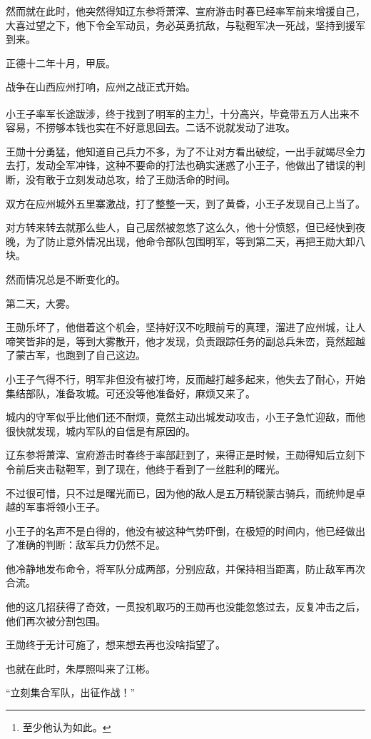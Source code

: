 \begin{multicols}{\theparacolNo}
然而就在此时，他突然得知辽东参将萧滓、宣府游击时春已经率军前来增援自己，大喜过望之下，他下令全军动员，务必英勇抗敌，与鞑靼军决一死战，坚持到援军到来。

正德十二年十月，甲辰。

战争在山西应州打响，应州之战正式开始。

小王子率军长途跋涉，终于找到了明军的主力\footnote{至少他认为如此。}，十分高兴，毕竟带五万人出来不容易，不捞够本钱也实在不好意思回去。二话不说就发动了进攻。

王勋十分勇猛，他知道自己兵力不多，为了不让对方看出破绽，一出手就竭尽全力去打，发动全军冲锋，这种不要命的打法也确实迷惑了小王子，他做出了错误的判断，没有敢于立刻发动总攻，给了王勋活命的时间。

双方在应州城外五里寨激战，打了整整一天，到了黄昏，小王子发现自己上当了。

对方转来转去就那么些人，自己居然被忽悠了这么久，他十分愤怒，但已经快到夜晚，为了防止意外情况出现，他命令部队包围明军，等到第二天，再把王勋大卸八块。

然而情况总是不断变化的。

第二天，大雾。

王勋乐坏了，他借着这个机会，坚持好汉不吃眼前亏的真理，溜进了应州城，让人啼笑皆非的是，等到大雾散开，他才发现，负责跟踪任务的副总兵朱峦，竟然超越了蒙古军，也跑到了自己这边。

小王子气得不行，明军非但没有被打垮，反而越打越多起来，他失去了耐心，开始集结部队，准备攻城。可还没等他准备好，麻烦又来了。

城内的守军似乎比他们还不耐烦，竟然主动出城发动攻击，小王子急忙迎敌，而他很快就发现，城内军队的自信是有原因的。

辽东参将萧滓、宣府游击时春终于率部赶到了，来得正是时候，王勋得知后立刻下令前后夹击鞑靼军，到了现在，他终于看到了一丝胜利的曙光。

不过很可惜，只不过是曙光而已，因为他的敌人是五万精锐蒙古骑兵，而统帅是卓越的军事将领小王子。

小王子的名声不是白得的，他没有被这种气势吓倒，在极短的时间内，他已经做出了准确的判断：敌军兵力仍然不足。

他冷静地发布命令，将军队分成两部，分别应敌，并保持相当距离，防止敌军再次合流。

他的这几招获得了奇效，一贯投机取巧的王勋再也没能忽悠过去，反复冲击之后，他们再次被分割包围。

王勋终于无计可施了，想来想去再也没啥指望了。

也就在此时，朱厚照叫来了江彬。

“立刻集合军队，出征作战！”


\end{multicols}

